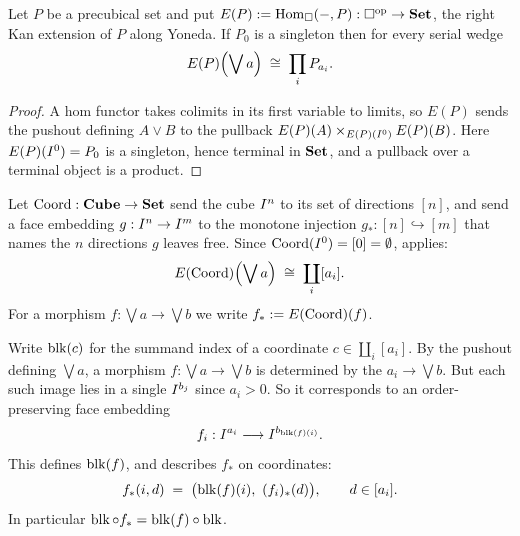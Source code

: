 \documentclass[11pt]{article}
\begin{document}
\begin{lemma}\label{lem:kan-right}
  Let $P$ be a precubical set and put $E(P) := \operatorname{Hom}_{\square}(-, P) : \square^{\mathrm{op}} \to \mathbf{Set}$, the right
  Kan extension of $P$ along Yoneda. 
  If $P_0$ is a singleton then for every serial wedge
  \begin{equation}\label{eq:kan-right}
    E(P)\Bigl(\bigvee a\Bigr) \;\cong\; \prod_i P_{a_i}.
  \end{equation}
\end{lemma}
\begin{proof}
  A hom functor takes colimits in its first variable to limits, so $E(P)$ sends the pushout defining
  $A \vee B$ to the pullback $E(P)(A) \times_{E(P)(I^{0})} E(P)(B)$. Here $E(P)(I^{0}) = P_0$ is
  a singleton, hence terminal in $\mathbf{Set}$, and a pullback over a terminal object is a product. 
\end{proof}

\begin{definition}\label{def:coord}
  Let $\operatorname{Coord} : \mathbf{Cube} \to \mathbf{Set}$ send the cube $I^{n}$ to its set of directions $[n]$, and send a
  face embedding $g : I^{n} \to I^{m}$ to the monotone injection
  $g_* : [n] \hookrightarrow [m]$ that names the $n$ directions $g$ leaves free. Since
  $\operatorname{Coord}(I^{0}) = [0] = \emptyset$,  applies:
  \[
    E(\operatorname{Coord})\Bigl(\bigvee a\Bigr) \;\cong\; \coprod_i [a_i].
  \]
  For a morphism $f : \bigvee a \to \bigvee b$ we write $f_* := E(\operatorname{Coord})(f)$.
\end{definition}

\begin{definition}\label{def:blk}
  Write $\operatorname{blk}(c)$ for the summand index of a coordinate $c \in \coprod_i [a_i]$. 
  By the pushout defining $\bigvee a$, a morphism $f : \bigvee a \to \bigvee b$ 
  is determined by the $a_i \to \bigvee b$.
  But each such image lies in a single $I^{b_j}$ since $a_i > 0$. 
  So it corresponds to an order-preserving face embedding
  \[
    f_i : I^{a_i} \longrightarrow I^{b_{\operatorname{blk}(f)(i)}}.
  \]
  This defines $\operatorname{blk}(f)$, and describes $f_*$ on coordinates:
  \begin{equation}\label{eq:blk-coord}
    f_*(i, d) \;=\; \bigl(\operatorname{blk}(f)(i),\ (f_i)_*(d)\bigr), \qquad d \in [a_i].
  \end{equation}
  In particular $\operatorname{blk} \circ f_* = \operatorname{blk}(f) \circ \operatorname{blk}$.
\end{definition}
\end{document}
